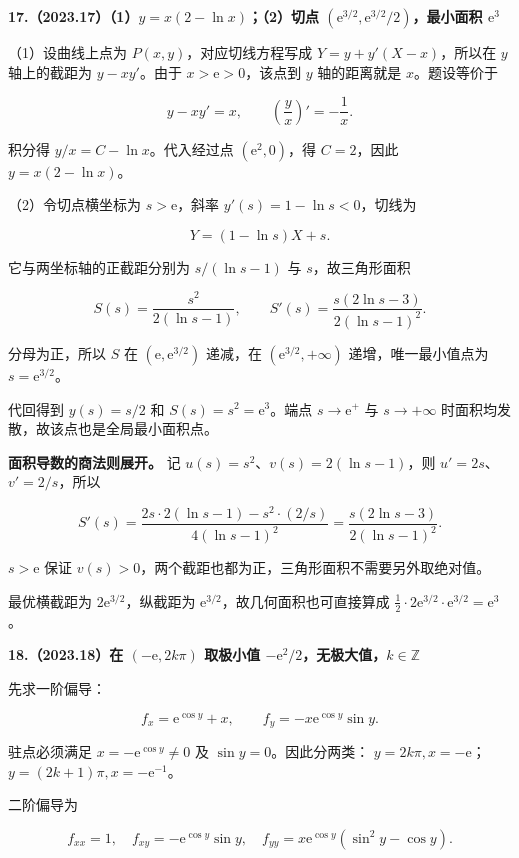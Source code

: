 \documentclass[UTF8,11pt,fontset=windows]{ctexart}
\begin{document}
\textbf{17.（2023.17）（1）$y=x(2-\ln x)$；（2）切点 $(\mathrm e^{3/2},\mathrm e^{3/2}/2)$，最小面积 $\mathrm e^3$}

（1）设曲线上点为 $P(x,y)$，对应切线方程写成 $Y=y+y'(X-x)$，所以在 $y$ 轴上的截距为 $y-xy'$。由于 $x>\mathrm e>0$，该点到 $y$ 轴的距离就是 $x$。题设等价于

$$
y-xy'=x,\qquad \left(\frac yx\right)'=-\frac1x.
$$

积分得 $y/x=C-\ln x$。代入经过点 $(\mathrm e^2,0)$，得 $C=2$，因此 $y=x(2-\ln x)$。

（2）令切点横坐标为 $s>\mathrm e$，斜率 $y'(s)=1-\ln s<0$，切线为

$$
Y=(1-\ln s)X+s.
$$

它与两坐标轴的正截距分别为 $s/(\ln s-1)$ 与 $s$，故三角形面积

$$
S(s)=\frac{s^2}{2(\ln s-1)},\qquad
S'(s)=\frac{s(2\ln s-3)}{2(\ln s-1)^2}.
$$

分母为正，所以 $S$ 在 $(\mathrm e,\mathrm e^{3/2})$ 递减，在 $(\mathrm e^{3/2},+\infty)$ 递增，唯一最小值点为 $s=\mathrm e^{3/2}$。

代回得到 $y(s)=s/2$ 和 $S(s)=s^2=\mathrm e^3$。端点 $s\to\mathrm e^+$ 与 $s\to+\infty$ 时面积均发散，故该点也是全局最小面积点。

\textbf{面积导数的商法则展开。} 记 $u(s)=s^2$、$v(s)=2(\ln s-1)$，则 $u'=2s$、$v'=2/s$，所以

$$
S'(s)=\frac{2s\cdot2(\ln s-1)-s^2\cdot(2/s)}{4(\ln s-1)^2}
=\frac{s(2\ln s-3)}{2(\ln s-1)^2}.
$$

$s>\mathrm e$ 保证 $v(s)>0$，两个截距也都为正，三角形面积不需要另外取绝对值。

最优横截距为 $2\mathrm e^{3/2}$，纵截距为 $\mathrm e^{3/2}$，故几何面积也可直接算成 $\frac12\cdot2\mathrm e^{3/2}\cdot\mathrm e^{3/2}=\mathrm e^3$。

\clearpage

\textbf{18.（2023.18）在 $(-\mathrm e,2k\pi)$ 取极小值 $-\mathrm e^2/2$，无极大值，$k\in\mathbb Z$}

先求一阶偏导：

$$
f_x=\mathrm e^{\cos y}+x,\qquad
f_y=-x\mathrm e^{\cos y}\sin y.
$$

驻点必须满足 $x=-\mathrm e^{\cos y}\ne0$ 及 $\sin y=0$。因此分两类：
$y=2k\pi,x=-\mathrm e$；$y=(2k+1)\pi,x=-\mathrm e^{-1}$。

二阶偏导为

$$
f_{xx}=1,\quad f_{xy}=-\mathrm e^{\cos y}\sin y,\quad
f_{yy}=x\mathrm e^{\cos y}(\sin^2y-\cos y).
$$
\end{document}
